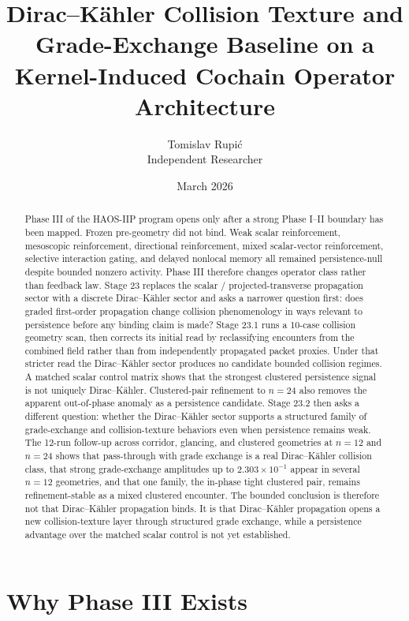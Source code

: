 \documentclass[11pt]{article}
\title{Dirac--K\"ahler Collision Texture and Grade-Exchange Baseline on a Kernel-Induced Cochain Operator Architecture}
\author{Tomislav Rupi\'c \\ Independent Researcher}
\date{March 2026}
\begin{document}
\maketitle

\begin{abstract}
Phase III of the HAOS-IIP program opens only after a strong Phase I--II boundary has been mapped. Frozen pre-geometry did not bind. Weak scalar reinforcement, mesoscopic reinforcement, directional reinforcement, mixed scalar-vector reinforcement, selective interaction gating, and delayed nonlocal memory all remained persistence-null despite bounded nonzero activity. Phase III therefore changes operator class rather than feedback law. Stage 23 replaces the scalar / projected-transverse propagation sector with a discrete Dirac--K\"ahler sector and asks a narrower question first: does graded first-order propagation change collision phenomenology in ways relevant to persistence before any binding claim is made? Stage 23.1 runs a 10-case collision geometry scan, then corrects its initial read by reclassifying encounters from the combined field rather than from independently propagated packet proxies. Under that stricter read the Dirac--K\"ahler sector produces no candidate bounded collision regimes. A matched scalar control matrix shows that the strongest clustered persistence signal is not uniquely Dirac--K\"ahler. Clustered-pair refinement to $n=24$ also removes the apparent out-of-phase anomaly as a persistence candidate. Stage 23.2 then asks a different question: whether the Dirac--K\"ahler sector supports a structured family of grade-exchange and collision-texture behaviors even when persistence remains weak. The 12-run follow-up across corridor, glancing, and clustered geometries at $n=12$ and $n=24$ shows that pass-through with grade exchange is a real Dirac--K\"ahler collision class, that strong grade-exchange amplitudes up to $2.303\times10^{-1}$ appear in several $n=12$ geometries, and that one family, the in-phase tight clustered pair, remains refinement-stable as a mixed clustered encounter. The bounded conclusion is therefore not that Dirac--K\"ahler propagation binds. It is that Dirac--K\"ahler propagation opens a new collision-texture layer through structured grade exchange, while a persistence advantage over the matched scalar control is not yet established.
\end{abstract}

\section{Why Phase III Exists}
\end{document}
